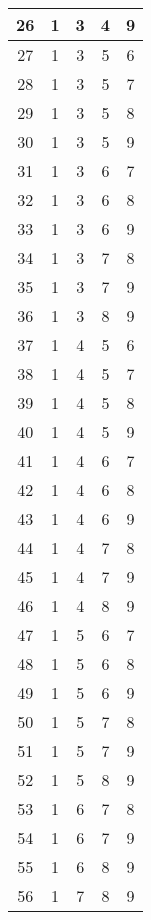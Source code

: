 \begin{longtable}{c | c c c c}
			\midrule 
			\multicolumn{1}{c|}{26} & 1 & 3 & 4 & 9 \\ 
			\midrule 
			\multicolumn{1}{c|}{27} & 1 & 3 & 5 & 6 \\ 
			\midrule 
			\multicolumn{1}{c|}{28} & 1 & 3 & 5 & 7 \\ 
			\midrule 
			\multicolumn{1}{c|}{29} & 1 & 3 & 5 & 8 \\ 
			\midrule 
			\multicolumn{1}{c|}{30} & 1 & 3 & 5 & 9 \\ 
			\midrule 
			\multicolumn{1}{c|}{31} & 1 & 3 & 6 & 7 \\ 
			\midrule 
			\multicolumn{1}{c|}{32} & 1 & 3 & 6 & 8 \\ 
			\midrule 
			\multicolumn{1}{c|}{33} & 1 & 3 & 6 & 9 \\ 
			\midrule 
			\multicolumn{1}{c|}{34} & 1 & 3 & 7 & 8 \\ 
			\midrule 
			\multicolumn{1}{c|}{35} & 1 & 3 & 7 & 9 \\ 
			\midrule 
			\multicolumn{1}{c|}{36} & 1 & 3 & 8 & 9 \\ 
			\midrule 
			\multicolumn{1}{c|}{37} & 1 & 4 & 5 & 6 \\ 
			\midrule 
			\multicolumn{1}{c|}{38} & 1 & 4 & 5 & 7 \\ 
			\midrule 
			\multicolumn{1}{c|}{39} & 1 & 4 & 5 & 8 \\ 
			\midrule 
			\multicolumn{1}{c|}{40} & 1 & 4 & 5 & 9 \\ 
			\midrule 
			\multicolumn{1}{c|}{41} & 1 & 4 & 6 & 7 \\ 
			\midrule 
			\multicolumn{1}{c|}{42} & 1 & 4 & 6 & 8 \\ 
			\midrule 
			\multicolumn{1}{c|}{43} & 1 & 4 & 6 & 9 \\ 
			\midrule 
			\multicolumn{1}{c|}{44} & 1 & 4 & 7 & 8 \\ 
			\midrule 
			\multicolumn{1}{c|}{45} & 1 & 4 & 7 & 9 \\ 
			\midrule 
			\multicolumn{1}{c|}{46} & 1 & 4 & 8 & 9 \\ 
			\midrule 
			\multicolumn{1}{c|}{47} & 1 & 5 & 6 & 7 \\ 
			\midrule 
			\multicolumn{1}{c|}{48} & 1 & 5 & 6 & 8 \\ 
			\midrule 
			\multicolumn{1}{c|}{49} & 1 & 5 & 6 & 9 \\ 
			\midrule 
			\multicolumn{1}{c|}{50} & 1 & 5 & 7 & 8 \\ 
			\midrule 
			\multicolumn{1}{c|}{51} & 1 & 5 & 7 & 9 \\ 
			\midrule 
			\multicolumn{1}{c|}{52} & 1 & 5 & 8 & 9 \\ 
			\midrule 
			\multicolumn{1}{c|}{53} & 1 & 6 & 7 & 8 \\ 
			\midrule 
			\multicolumn{1}{c|}{54} & 1 & 6 & 7 & 9 \\ 
			\midrule 
			\multicolumn{1}{c|}{55} & 1 & 6 & 8 & 9 \\ 
			\midrule 
			\multicolumn{1}{c|}{56} & 1 & 7 & 8 & 9 \\ 
			\bottomrule 
			
		\end{longtable}
